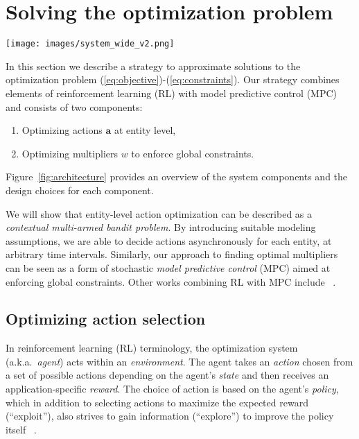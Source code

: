 \section{Solving the optimization problem}\label{sec:algo}

\begin{figure*} %
\centering
\captionsetup{justification=centering,margin=0.4cm}
\texttt{[image: images/system\_wide\_v2.png]}
\caption{Predictive Response Optimization system design}\label{fig:architecture}
\end{figure*}

In this section we describe a strategy to approximate solutions to the optimization problem (\ref{eq:objective})-(\ref{eq:constraints}). Our strategy combines elements of reinforcement learning (RL) with model predictive control (MPC) and consists of two components:
\begin{enumerate}
\squeezelist
	\item Optimizing actions $\mathbf{a}$ at entity level,
	\item Optimizing multipliers $w$ to enforce global constraints.
\end{enumerate}
Figure~\ref{fig:architecture} provides an overview of the system components and the design choices for each component. 

We will show that entity-level action optimization can be described as a \emph{contextual multi-armed bandit problem}. By introducing suitable modeling assumptions, we are able to decide actions asynchronously for each entity, at arbitrary time intervals. Similarly, our approach to finding optimal multipliers can be seen as a form of stochastic \emph{model predictive control} (MPC) aimed at enforcing global constraints. Other works combining RL with MPC include ~\cite{arroyo2022reinforced,zanon2020safe}. 
 
\subsection{Optimizing action selection}\label{sec:model}

In  reinforcement learning (RL) terminology, the optimization system (a.k.a.~\textit{agent}) acts within an {\em environment}. The agent takes an {\em action} chosen from a set of possible actions depending on the agent's {\em state} and then receives an application-specific {\em reward}. The choice of action is based on the agent's {\em policy}, which in addition to selecting actions to maximize the expected reward (``exploit''), also strives to gain information (``explore'') to improve the policy itself ~\cite{sutton2018reinforcement}.

